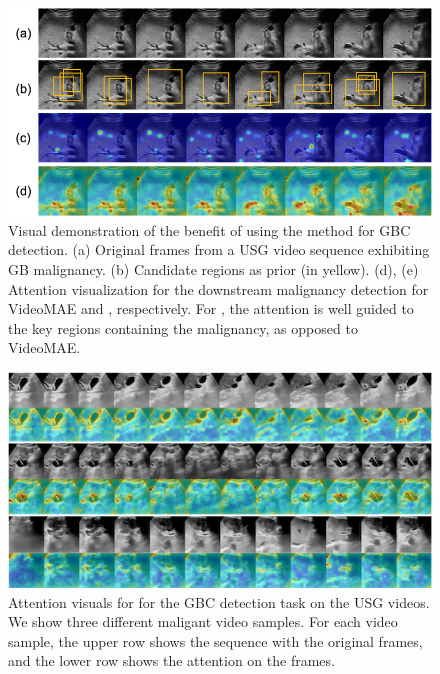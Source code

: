 
\begin{figure}[t]
    \centering
    \includegraphics[width=\linewidth]{figs/vis_gbc_focusmae.png}
    \caption[Visual demonstration of the benefit of using the \focusmae]{Visual demonstration of the benefit of using the \focusmae method for GBC detection. (a) Original frames from a USG video sequence exhibiting GB malignancy. (b) Candidate regions as prior (in yellow). (d), (e) Attention visualization for the downstream malignancy detection for VideoMAE and \focusmae, respectively. For \focusmae, the attention is well guided to the key regions containing the malignancy, as opposed to VideoMAE.}
    \label{focusmae_fig:qualitative}
\end{figure}

\begin{figure}[!ht]
    \centering
    \includegraphics[width=\linewidth]{figs/vis_attention_gbc.png}
    \caption[Attention visuals for \focusmae for GBC detection]{Attention visuals for \focusmae for the GBC detection task on the USG videos. We show three different maligant video samples. For each video sample, the upper row shows the sequence with the original frames, and the lower row shows the attention on the frames.}
    \label{focusmae_fig:visual_supp_gbc}
\end{figure}

